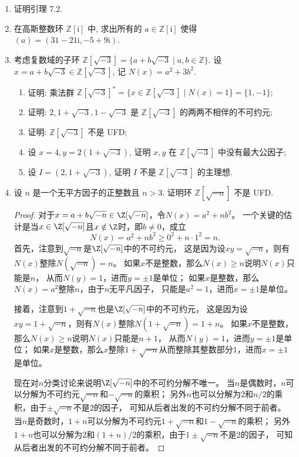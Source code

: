 \begin{enumerate}

\item 证明引理 7.2.

\item 在高斯整数环 $ \mathbb{Z}[\mathrm{i}] $ 中, 求出所有的 $ a \in \mathbb{Z}[\mathrm{i}] $ 使得 $(a) = (31 - 21\mathrm{i}, -5 + 9\mathrm{i})$.

\item 考虑复数域的子环 $ \mathbb{Z}[\sqrt{-3}] = \{a + b\sqrt{-3} \mid a, b \in \mathbb{Z}\} $. 设 $ x = a + b\sqrt{-3} \in \mathbb{Z}[\sqrt{-3}] $, 记 $ N(x) = a^2 + 3b^2 $.
\begin{enumerate}[label=(\arabic*)]
    \item 证明: 乘法群 $ \mathbb{Z}[\sqrt{-3}]^* = \{x \in \mathbb{Z}[\sqrt{-3}] \mid N(x) = 1\} = \{1, -1\}; $
    \item 证明: $2, 1 + \sqrt{-3}, 1 - \sqrt{-3}$ 是 $ \mathbb{Z}[\sqrt{-3}] $ 的两两不相伴的不可约元;
    \item 证明: $ \mathbb{Z}[\sqrt{-3}] $ 不是 UFD;
    \item 设 $ x = 4, y = 2(1 + \sqrt{-3}) $, 证明 $ x, y $ 在 $ \mathbb{Z}[\sqrt{-3}] $ 中没有最大公因子;
    \item 设 $ I = (2, 1 + \sqrt{-3}) $, 证明 $ I $ 不是 $ \mathbb{Z}[\sqrt{-3}] $ 的主理想.
\end{enumerate}

\item 设 $ n $ 是一个无平方因子的正整数且 $ n > 3 $. 证明环 $ \mathbb{Z}[\sqrt{-n}] $ 不是 UFD.
\begin{proof}
    对于$x=a+b\sqrt{-n}\in\Z[\sqrt{-n}]$，令$N(x)=a^2+nb^2$。
    一个关键的估计是当$x\in\Z[\sqrt{-n}]$且$x\notin\Z$时，即$b\ne0$，成立
    \[N(x)=a^2+nb^2\geqslant0^2+n\cdot1^2=n.\]
    首先，注意到$\sqrt{-n}$是$\Z[\sqrt{-n}]$中的不可约元，
    这是因为设$xy=\sqrt{-n}$，则有$N(x)$整除$N(\sqrt{-n})=n$。
    如果$x$不是整数，那么$N(x) \geqslant n$说明$N(x)$只能是$n$，
    从而$N(y)=1$，进而$y=\pm1$是单位；
    如果$x$是整数，那么$N(x)=a^2$整除$n$，由于$n$无平凡因子，
    只能是$a^2=1$，进而$x=\pm1$是单位。
    
    接着，注意到$1+\sqrt{-n}$也是$\Z[\sqrt{-n}]$中的不可约元，
    这是因为设$xy=1+\sqrt{-n}$，则有$N(x)$整除$N(1+\sqrt{-n})=1+n$。
    如果$x$不是整数，那么$N(x) \geqslant n$说明$N(x)$只能是$n+1$，
    从而$N(y)=1$，进而$y=\pm1$是单位；
    如果$x$是整数，那么$x$整除$1+\sqrt{-n}$从而整除其整数部分$1$，进而$x=\pm1$是单位。
    
    现在对$n$分类讨论来说明$\Z[\sqrt{-n}]$中的不可约分解不唯一。
    当$n$是偶数时，$n$可以分解为不可约元$\sqrt{-n}$和$-\sqrt{-n}$的乘积；
    另外$n$也可以分解为$2$和$n/2$的乘积，由于$\pm\sqrt{-n}$不是$2$的因子，
    可知从后者出发的不可约分解不同于前者。
    当$n$是奇数时，$1+n$可以分解为不可约元$1+\sqrt{-n}$和$1-\sqrt{-n}$的乘积；
    另外$1+n$也可以分解为$2$和$(1+n)/2$的乘积，由于$1\pm\sqrt{-n}$不是$2$的因子，
    可知从后者出发的不可约分解不同于前者。
\end{proof}


\end{enumerate}
